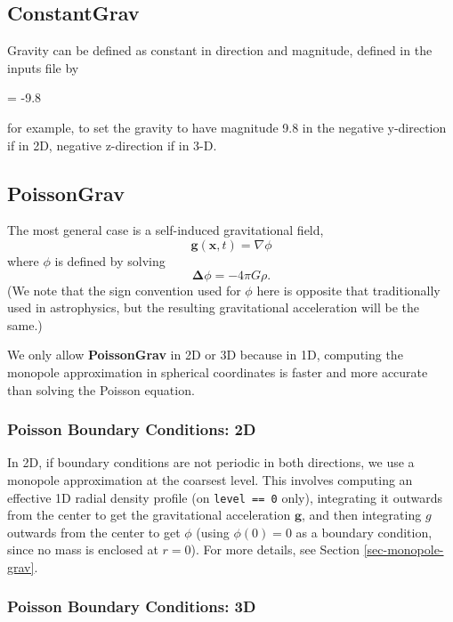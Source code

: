 \subsection{ConstantGrav}

Gravity can be defined as constant in direction and magnitude, 
defined in the inputs file by 

 = -9.8

for example, to set the gravity to have magnitude 9.8 in the 
negative y-direction if in 2D, negative z-direction if in 3-D.

\subsection{PoissonGrav}

The most general case is a self-induced gravitational field, 
\begin{equation}
\mathbf{g}(\mathbf{x},t) = \nabla \phi 
\end{equation}
where $\phi$ is defined by solving
\begin{equation}
\mathbf{\Delta} \phi = -4 \pi G \rho .\label{eq:Self Gravity}
\end{equation}
(We note that the sign convention used for $\phi$ here is opposite
that traditionally used in astrophysics, but the resulting
gravitational acceleration will be the same.)

We only allow {\bf PoissonGrav} in 2D or 3D because in 1D, computing the monopole 
approximation in spherical coordinates is faster and more accurate than solving
the Poisson equation.

\subsubsection{Poisson Boundary Conditions: 2D}

In 2D, if boundary conditions are not periodic in both directions, we use a 
monopole approximation at the coarsest level. This involves computing an effective
1D radial density profile (on \texttt{level == 0} only), integrating it outwards
from the center to get the gravitational acceleration $\mathbf{g}$, and then integrating
$g$ outwards from the center to get $\phi$ (using $\phi(0) = 0$ as a boundary condition,
since no mass is enclosed at $r = 0$). For more details, see Section \ref{sec-monopole-grav}.

\subsubsection{Poisson Boundary Conditions: 3D}\label{sec-poisson-3d-bcs}

